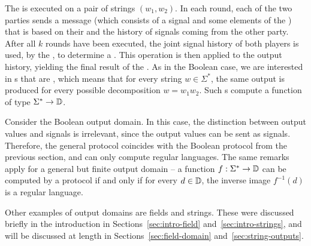 The  is executed on a pair of strings $(w_1,w_2)$. In each round, each of the two parties  sends a message (which consists of a signal and some elements of the ) that is based on their  and the history of signals coming from the other party. After all $k$ rounds have been executed, the joint signal history of both players is used, by the , to determine a . This operation is then applied to the output history, yielding the final result of the . As in the Boolean case, we are interested in s that are , which means that for every string $w \in \Sigma^*$, the same output is produced for every possible decomposition $w = w_1 w_2$. Such s compute a function of type $\Sigma^* \to \mathbb D$. 

\begin{myexample}
    Consider the Boolean output domain. In this case, the distinction between output values and signals is irrelevant, since the output values can be sent as signals. Therefore, the general protocol coincides with the Boolean protocol from the previous section, and  can only compute regular languages.  The same remarks apply for a general but finite output domain -- a function $f : \Sigma^* \to \mathbb D$ can be computed by a protocol if and only if for every $d \in \mathbb D$, the inverse image $f^{-1}(d)$ is a regular language.
\end{myexample}

Other examples of output domains are fields and strings. These were discussed  briefly in the introduction in Sections~\ref{sec:intro-field} and~\ref{sec:intro-strings},  and will be discussed at length in Sections~\ref{sec:field-domain} and~\ref{sec:string-outputs}.  


